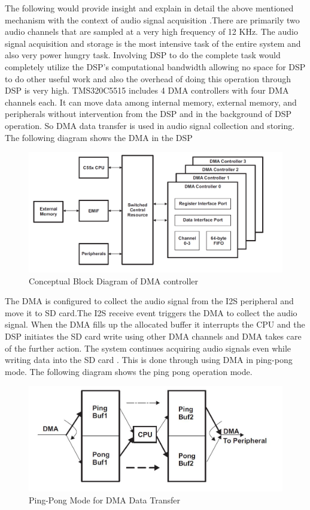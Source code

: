  The following would provide insight and explain in detail the above mentioned mechanism with the context of audio signal acquisition .There are primarily two audio channels that are sampled at a very high frequency of 12 KHz. The audio signal acquisition and storage is the most intensive task of the entire system and also very power hungry task. Involving DSP to do the complete task would completely utilize the DSP's computational bandwidth allowing no space for DSP to do other useful work and also the overhead of doing this operation through DSP is very high.  TMS320C5515 includes 4 DMA controllers with four DMA channels each. It can move data among internal memory, external memory, and peripherals without intervention from the DSP and in the background of DSP operation. So DMA data transfer is used in audio signal collection and storing.  The following diagram shows the DMA in the DSP 
 \begin{figure}[h]
 	\centering
 	\includegraphics[scale = 0.5 ]{DMA_overview.PNG}
 	\caption{Conceptual Block Diagram of DMA controller\label{DMA_Architecture}}
 \end{figure} 
 The DMA is configured to collect the audio signal from the I2S peripheral and move it to SD card.The I2S receive event triggers the DMA to collect the audio signal. When the DMA fills up the allocated buffer it interrupts the CPU and the DSP initiates the SD card write using  other DMA channels and DMA takes care of the further action. The system continues acquiring audio signals even while writing data into the SD card . This is done through using DMA in ping-pong mode. The following diagram shows the ping pong operation mode.
  \begin{figure}[h]
 	\centering
 	\includegraphics[scale = 0.5 ]{ping_pong.JPG}
 	\caption{Ping-Pong Mode for DMA Data Transfer\label{ping_pong}}
 \end{figure}
